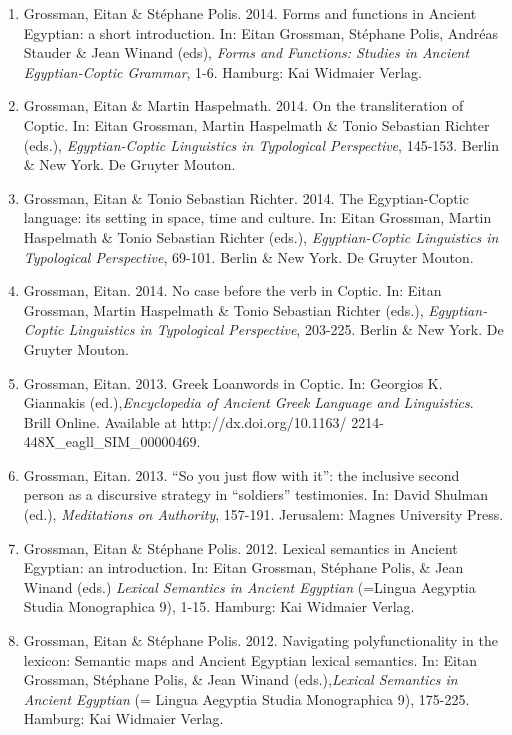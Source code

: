 \documentclass[letterpaper,11pt]{article}
\begin{document}
\begin{enumerate}[resume]
\item	Grossman, Eitan \& St\'ephane Polis. 2014. Forms and functions in Ancient Egyptian: a short introduction. In: Eitan Grossman, St\'ephane Polis, Andréas Stauder \& Jean Winand (eds), \textit{Forms and Functions: Studies in Ancient Egyptian-Coptic Grammar}, 1-6. Hamburg: Kai Widmaier Verlag. 

\item	Grossman, Eitan \& Martin Haspelmath. 2014. On the transliteration of Coptic. In: Eitan Grossman, Martin Haspelmath \& Tonio Sebastian Richter (eds.), \textit{Egyptian-Coptic Linguistics in Typological Perspective}, 145-153. Berlin \& New York. De Gruyter Mouton. 

\item	Grossman, Eitan \& Tonio Sebastian Richter. 2014. The Egyptian-Coptic language: its setting in space, time and culture. In: Eitan Grossman, Martin Haspelmath \& Tonio Sebastian Richter (eds.), \textit{Egyptian-Coptic Linguistics in Typological Perspective}, 69-101. Berlin \& New York. De Gruyter Mouton. 

\item	Grossman, Eitan. 2014. No case before the verb in Coptic. In: Eitan Grossman, Martin Haspelmath \& Tonio Sebastian Richter (eds.), \textit{Egyptian-Coptic Linguistics in Typological Perspective}, 203-225. Berlin \& New York. De Gruyter Mouton.

\item Grossman, Eitan. 2013. Greek Loanwords in Coptic. In: Georgios K. Giannakis (ed.),\textit{Encyclopedia of Ancient Greek Language and Linguistics}. Brill Online. Available at http://dx.doi.org/10.1163/
2214-448X\_eagll\_SIM\_00000469. 

\item	Grossman, Eitan. 2013. “So you just flow with it”: the inclusive second person as a discursive strategy in “soldiers” testimonies. In: David Shulman (ed.), \textit{Meditations on Authority}, 157-191. Jerusalem: Magnes University Press. 

\item Grossman, Eitan \& St\'ephane Polis. 2012. Lexical semantics in Ancient Egyptian: an introduction. In: Eitan Grossman, St\'ephane Polis, \& Jean Winand (eds.) \textit{Lexical Semantics in Ancient Egyptian} (=Lingua Aegyptia Studia Monographica 9), 1-15. Hamburg: Kai Widmaier Verlag.\\


\item Grossman, Eitan \& St\'ephane Polis. 2012. Navigating polyfunctionality in the lexicon: Semantic maps and Ancient Egyptian lexical semantics. In: Eitan Grossman, St\'ephane Polis, \& Jean Winand (eds.),\textit{Lexical Semantics in Ancient Egyptian} (= Lingua Aegyptia Studia Monographica 9), 175-225. Hamburg: Kai Widmaier Verlag. 


\end{enumerate}
\end{document}
